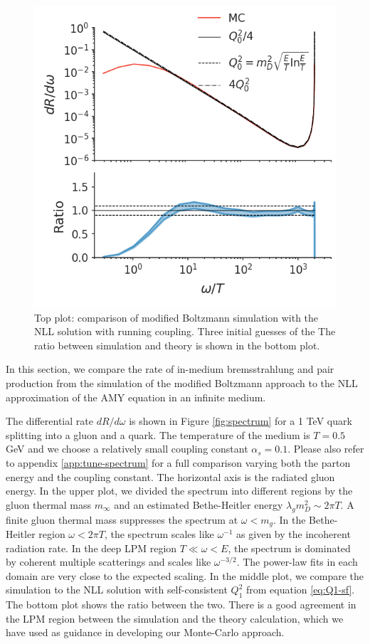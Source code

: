 \documentclass[aps, prc, reprint, amsmath, groupedaddress, nofootinbib]{revtex4-1}
\begin{document}
\begin{figure}
\includegraphics[width=\columnwidth]{running.png}
\caption{Top plot: comparison of modified Boltzmann simulation with the NLL solution  with running coupling.
Three initial guesses of the 
The ratio between simulation and theory is shown in the bottom plot.}
\label{fig:running}
\end{figure}

In this section, we compare the rate of in-medium bremsstrahlung and pair production from the simulation of the modified Boltzmann approach to the NLL approximation of the AMY equation in an infinite medium.

The differential rate $dR/d\omega$ is shown in Figure \ref{fig:spectrum} for a 1 TeV quark splitting into a gluon and a quark.
The temperature of the medium is $T=0.5$ GeV and we choose a relatively small coupling constant $\alpha_s = 0.1$.
Please also refer to appendix \ref{app:tune-spectrum} for a full comparison varying both the parton energy and the coupling constant.
The horizontal axis is the radiated gluon energy.
In the upper plot, we divided the spectrum into different regions by the gluon thermal mass $m_\infty$ and an estimated Bethe-Heitler energy $\lambda_g m_D^2 \sim 2\pi T$.
 A finite gluon thermal mass suppresses the spectrum at $\omega < m_g$.
In the Bethe-Heitler region $\omega < 2\pi T$, the spectrum scales like $\omega^{-1}$ as given by the incoherent radiation rate.
In the deep LPM region $T \ll \omega < E$, the spectrum is dominated by coherent multiple scatterings and scales like $\omega^{-3/2}$.
The power-law fits in each domain are very close to the expected scaling.
In the middle plot, we compare the simulation to the NLL solution with self-consistent $Q_1^2$ from equation \ref{eq:Q1-sf}. 
The bottom plot shows the ratio between the two.
There is a good agreement in the LPM region between the simulation and the theory calculation, which we have used as guidance in developing our Monte-Carlo approach.
\end{document}
